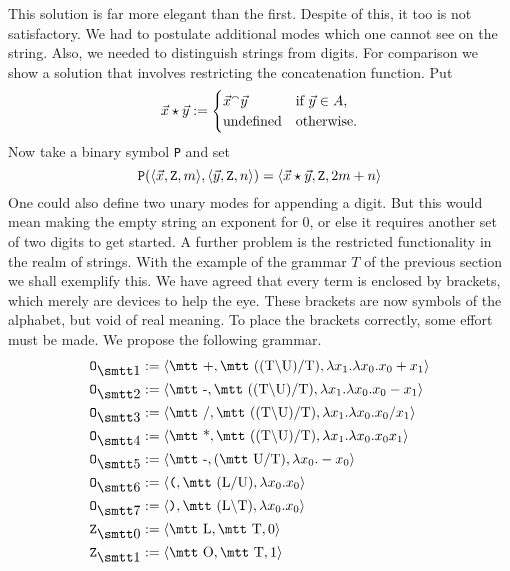 This solution is far more elegant than the first. Despite of
this, it too is not satisfactory. We had to postulate
additional modes which one cannot see on the string. Also, 
we needed to distinguish strings from digits. For 
comparison we show a solution that involves restricting the 
concatenation function. Put 
\begin{equation}
\vec{x} \star \vec{y} := 
\begin{cases} 
\vec{x}{^{\smallfrown}} \vec{y} & \text{if $\vec{y} \in A$,} \\
\text{undefined} & \text{otherwise.}
\end{cases}
\end{equation}
Now take a binary symbol {\tt P} and set 
\begin{equation}
\mbox{\tt P}(\langle \vec{x}, \mbox{\tt Z}, m\rangle, 
\langle \vec{y}, \mbox{\tt Z}, n\rangle) = 
\langle \vec{x} \star \vec{y}, \mbox{\tt Z}, 2m+n\rangle 
\end{equation}
One could also define two unary modes for appending a digit. 
But this would mean making the empty string an exponent for 0, 
or else it requires another set of two digits to get started. 
A further problem is the restricted
functionality in the realm of strings. With the example
of the grammar $T$ of the previous section we shall exemplify
this. We have agreed that every term is enclosed by brackets,
which merely are devices to help the eye. These brackets are
now symbols of the alphabet, but void of real meaning.
To place the brackets correctly, some effort must be made.
We propose the following grammar.
\begin{align}
\notag
\mbox{\tt O}_{\seins} & := \auf \mbox{\mtt +}, \mbox{\mtt ((T{\tb}U){\tf}T)},
    \lambda x_1.\lambda x_0.x_0+x_1 \zu\\
\notag
\mbox{\tt O}_{\szwei} & := \auf \mbox{\mtt -}, \mbox{\mtt ((T{\tb}U){\tf}T)},
    \lambda x_1.\lambda x_0.x_0-x_1 \zu \\
\notag
\mbox{\tt O}_{\sdrei} & := \auf \mbox{\mtt \symbol{47}}, 
	\mbox{\mtt ((T{\tb}U){\tf}T)},
    \lambda x_1.\lambda x_0.x_0/x_1\zu \\
\notag
\mbox{\tt O}_{\svier} & := \auf \mbox{\mtt \symbol{42}}, 
	\mbox{\mtt ((T{\tb}U){\tf}T)},
    \lambda x_1.\lambda x_0.x_0x_1\zu \\
\mbox{\tt O}_{\sfuenf} & := \auf \mbox{\mtt -}, (\mbox{\mtt U{\tf}T)},
    \lambda x_0.-x_0 \zu \\
\notag
\mbox{\tt O}_{\ssechs} & := \auf \mbox{\tt (}, \mbox{\mtt (L{\tf}U)},
    \lambda x_0.x_0 \zu \\
\notag
\mbox{\tt O}_{\ssieben} & := \auf \mbox{\tt )}, \mbox{\mtt (L{\tb}T)},
    \lambda x_0.x_0\zu \\
\notag
\mbox{\tt Z}_{\snull} & := \auf \mbox{\mtt L}, \mbox{\mtt T}, 0\zu \\
\notag
\mbox{\tt Z}_{\seins} & := \auf \mbox{\mtt O}, \mbox{\mtt T}, 1\zu
\end{align}

